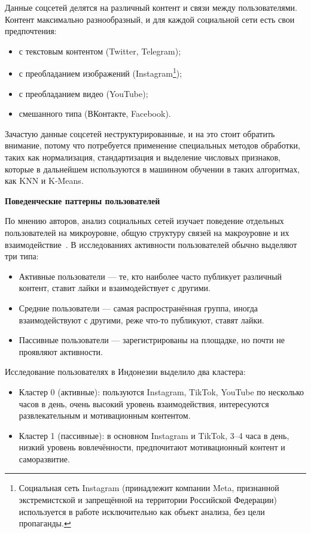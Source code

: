 \documentclass[14pt, a4paper]{extarticle}
\begin{document}
Данные соцсетей делятся на различный контент и связи между пользователями.
Контент максимально разнообразный, и для каждой социальной сети есть свои предпочтения:

\begin{itemize}
    \item с текстовым контентом (Twitter, Telegram);
    \item с преобладанием изображений (Instagram\footnote{Социальная сеть Instagram (принадлежит компании Meta, признанной экстремистской и запрещённой на территории Российской Федерации) используется в работе исключительно как объект анализа, без цели пропаганды.});
    \item с преобладанием видео (YouTube);
    \item смешанного типа (ВКонтакте, Facebook).
\end{itemize}

Зачастую данные соцсетей неструктурированные, и на это стоит обратить внимание, потому что потребуется
применение специальных методов обработки, таких как нормализация, стандартизация и выделение числовых признаков, которые в дальнейшем используются в машинном обучении в таких алгоритмах, как KNN и K‑Means.

\textbf{Поведенческие паттерны пользователей}
\smallskip

По мнению авторов, анализ социальных сетей изучает поведение отдельных пользователей на микроуровне, общую
структуру связей на макроуровне и их взаимодействие~\cite{savin2020}.
В исследованиях активности пользователей обычно выделяют три типа:

\begin{itemize}
    \item Активные пользователи --- те, кто наиболее часто публикует различный контент, ставит лайки и взаимодействует с другими.
    \item Средние пользователи --- самая распространённая группа, иногда взаимодействуют с другими, реже что-то публикуют, ставят лайки.
    \item Пассивные пользователи --- зарегистрированы на площадке, но почти не проявляют активности.
\end{itemize}

Исследование пользователях в Индонезии выделило два кластера:

\begin{itemize}
    \item Кластер 0 (активные): пользуются Instagram, TikTok, YouTube по несколько часов в день, очень высокий уровень взаимодействия, интересуются развлекательным и мотивационным контентом.
    \item Кластер 1 (пассивные): в основном Instagram и TikTok, 3–4 часа в день, низкий уровень вовлечённости, предпочитают мотивационный контент и саморазвитие.
\end{itemize}
\end{document}
